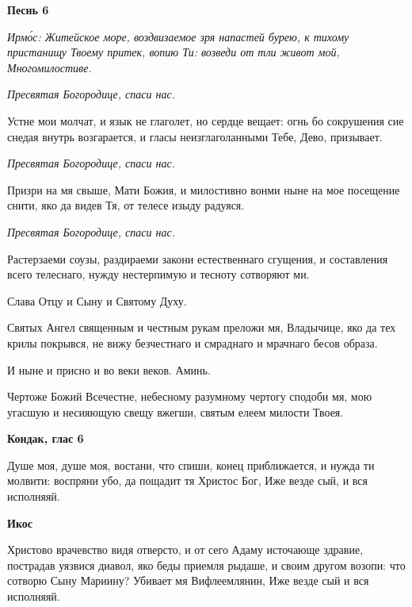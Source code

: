  

\bfseries Песнь 6\normalfont{}


 \itshape Ирмо́с:\normalfont{} Житейское море, воздвизаемое зря напастей бурею, к тихому
пристанищу Твоему притек, вопию Ти: возведи от тли живот мой, Многомилостиве.



 \itshape  Пресвятая Богородице, спаси нас.
\normalfont{}


   Устне мои молчат, и язык не глаголет, но сердце вещает: огнь бо
сокрушения сие снедая внутрь возгарается, и гласы неизглаголанными Тебе,
Дево, призывает.



 \itshape  Пресвятая Богородице, спаси нас.
\normalfont{}


   Призри на мя свыше, Мати Божия, и милостивно вонми ныне на мое
посещение снити, яко да видев Тя, от телесе изыду радуяся.



 \itshape  Пресвятая Богородице, спаси нас.
\normalfont{}


   Растерзаеми соузы, раздираеми закони естественнаго сгущения, и
составления всего телеснаго, нужду нестерпимую и тесноту сотворяют
ми.



   Слава Отцу и Сыну и Святому Духу.



   Святых Ангел священным и честным рукам преложи мя, Владычице, яко
да тех крилы покрывся, не вижу безчестнаго и смраднаго и мрачнаго бесов
образа.



   И ныне и присно и во веки веков. Аминь.



   Чертоже Божий Всечестне, небесному разумному чертогу сподоби мя,
мою угасшую и несияющую свещу вжегши, святым елеем милости
Твоея.



 

\bfseries Кондак, глас 6\normalfont{}


   Душе моя, душе моя, востани, что спиши, конец приближается, и нужда
ти молвити: воспряни убо, да пощадит тя Христос Бог, Иже везде сый, и вся
исполняяй.




 

\bfseries Икос\normalfont{}


   Христово врачевство видя отверсто, и от сего Адаму источающе здравие,
пострадав уязвися диавол, яко беды приемля рыдаше, и своим другом
возопи: что сотворю Сыну Мариину? Убивает мя Вифлеемлянин, Иже везде
сый и вся исполняяй.



